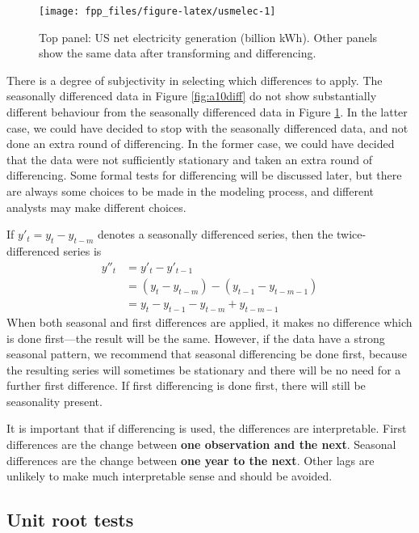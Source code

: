 \documentclass[]{book}
\begin{document}
\begin{figure}

{\centering \texttt{[image: fpp\_files/figure-latex/usmelec-1]} 

}

\caption{Top panel: US net electricity generation (billion kWh). Other panels show the same data after transforming and differencing.}\label{fig:usmelec}
\end{figure}

There is a degree of subjectivity in selecting which differences to apply. The seasonally differenced data in Figure \ref{fig:a10diff} do not show substantially different behaviour from the seasonally differenced data in Figure \ref{fig:usmelec}. In the latter case, we could have decided to stop with the seasonally differenced data, and not done an extra round of differencing. In the former case, we could have decided that the data were not sufficiently stationary and taken an extra round of differencing. Some formal tests for differencing will be discussed later, but there are always some choices to be made in the modeling process, and different analysts may make different choices.

If \(y'_t = y_t - y_{t-m}\) denotes a seasonally differenced series, then the twice-differenced series is
\begin{align*}
y''_t &= y'_t - y'_{t-1} \\
      &= (y_t - y_{t-m}) - (y_{t-1} - y_{t-m-1}) \\
      &= y_t -y_{t-1} - y_{t-m} + y_{t-m-1}\:
\end{align*}
When both seasonal and first differences are applied, it makes no difference which is done first---the result will be the same. However, if the data have a strong seasonal pattern, we recommend that seasonal differencing be done first, because the resulting series will sometimes be stationary and there will be no need for a further first difference. If first differencing is done first, there will still be seasonality present.

It is important that if differencing is used, the differences are interpretable. First differences are the change between \textbf{one observation and the next}. Seasonal differences are the change between \textbf{one year to the next}. Other lags are unlikely to make much interpretable sense and should be avoided.

\hypertarget{unit-root-tests}{%
\subsection*{Unit root tests}\label{unit-root-tests}}
\end{document}
